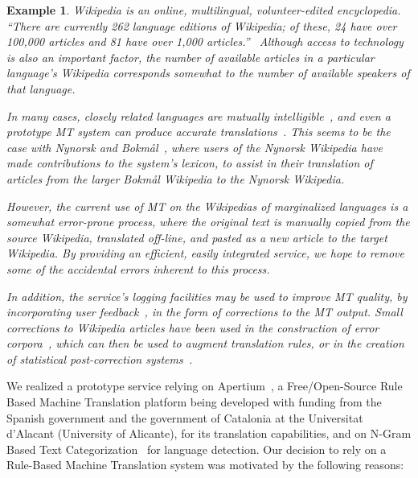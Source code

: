 \documentclass[11pt]{article}
\newtheorem{ex}[theo]{Example}
\begin{document}
\begin{ex}
Wikipedia is an online, multilingual, volunteer-edited 
encyclopedia. ``There are currently 262 language editions of Wikipedia; of 
these, 24 have over 100,000 articles and 81 have over 1,000 articles.''~\citep{wikipedia}
Although access to technology is also an important factor, the number of 
available articles in a particular language's Wikipedia corresponds somewhat
to the number of available speakers of that language. 

In many cases, closely related languages are mutually intelligible~\citep{tyers09a}, 
and even a prototype MT system can produce accurate translations~\citep{oller06}.
This seems to be the case with Nynorsk and Bokmål~\citep{unhammer09}, where
users of the Nynorsk Wikipedia have made contributions to the system's 
lexicon, to assist in their translation of articles from the larger Bokmål 
Wikipedia to the Nynorsk Wikipedia.

However, the current use of MT on the Wikipedias of marginalized languages is a
somewhat error-prone process, where the original text is manually copied from
the source Wikipedia, translated off-line, and pasted as a new article to the 
target Wikipedia. By providing an efficient, easily integrated service, we
hope to remove some of the accidental errors inherent to this process.

In addition, the service's logging facilities may be used to improve MT
quality, by incorporating user feedback~\citep{google}, in the form of 
corrections to the MT output. Small corrections to Wikipedia articles have
been used in the construction of error corpora~\citep{milek08}, which can
then be used to augment translation rules, or in the creation of statistical
post-correction systems~\citep{dugast07}.
\end{ex}

We realized a prototype service relying on Apertium~\citep{armentano05p}, a Free/Open-Source Rule Based Machine Translation platform being 
developed with funding from the Spanish government and the government of Catalonia at the Universitat d'Alacant (University of Alicante), 
for its translation capabilities, and on N-Gram Based Text Categorization~\citep{textcat} for language detection. Our decision to rely on a
Rule-Based Machine Translation system was motivated by the following reasons:
\end{document}
